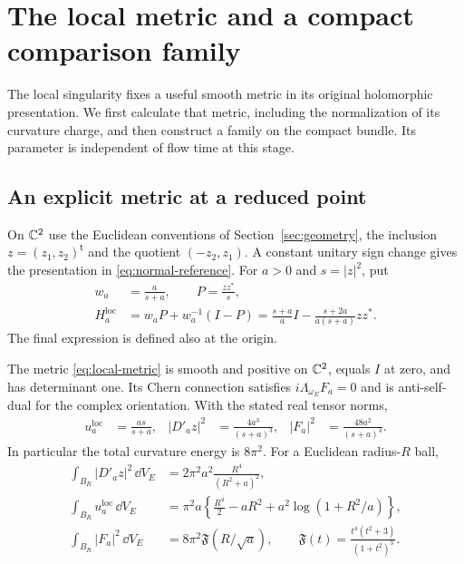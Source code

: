 \section{The local metric and a compact comparison family}
\label{sec:comparison-metrics}

The local singularity fixes a useful smooth metric in its original
holomorphic presentation. We first calculate that metric, including
the normalization of its curvature charge, and then construct a
family on the compact bundle. Its parameter is independent of flow
time at this stage.

\subsection{An explicit metric at a reduced point}

On $\mathbb C^2$ use the Euclidean conventions of
Section~\ref{sec:geometry}, the inclusion $z=(z_1,z_2)^{\mathsf t}$
and the quotient $(-z_2,z_1)$. A constant unitary sign change gives
the presentation in \eqref{eq:normal-reference}. For $a>0$ and
$s=|z|^2$, put
\begin{equation}\label{eq:local-metric}
 \begin{aligned}
 w_a&=\frac{a}{s+a},\qquad P=\frac{zz^*}{s},\\
 H_a^{\mathrm{loc}}
     &=w_aP+w_a^{-1}(I-P)
       =\frac{s+a}{a}I-\frac{s+2a}{a(s+a)}zz^* .
 \end{aligned}
\end{equation}
The final expression is defined also at the origin.

\begin{lemma}\label{lem:local-metric}
The metric \eqref{eq:local-metric} is smooth and positive on
$\mathbb C^2$, equals $I$ at zero, and has determinant one. Its Chern
connection satisfies $i\Lambda_{\omega_E}F_a=0$ and is anti-self-dual
for the complex orientation. With the stated real tensor norms,
\begin{equation}\label{eq:local-densities}
 \begin{aligned}
 u_a^{\mathrm{loc}}&=\frac{as}{s+a},&
 |D'_az|^2&=\frac{4a^3}{(s+a)^3},&
 |F_a|^2&=\frac{48a^2}{(s+a)^4}.
 \end{aligned}
\end{equation}
In particular the total curvature energy is $8\pi^2$. For a
Euclidean radius-$R$ ball,
\begin{align}
 \int_{B_R}|D'_az|^2\,\dd V_E
   &=2\pi^2a^2\frac{R^4}{(R^2+a)^2},
       \label{eq:local-section-energy}\\
 \int_{B_R}u_a^{\mathrm{loc}}\,\dd V_E
   &=\pi^2a\left\{\frac{R^4}{2}-aR^2
                         +a^2\log(1+R^2/a)\right\},
       \label{eq:local-mass}\\
 \int_{B_R}|F_a|^2\,\dd V_E
   &=8\pi^2\mathfrak F(R/\sqrt a),\qquad
 \mathfrak F(t)=\frac{t^4(t^2+3)}{(1+t^2)^3}.
       \label{eq:local-curvature-energy}
\end{align}
\end{lemma}

